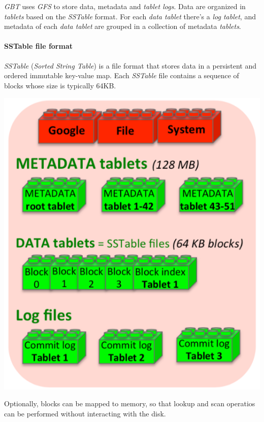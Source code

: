 \noindent\begin{minipage}[c]{0.7\textwidth}
    \emph{GBT} uses \emph{GFS} to store data, metadata and \emph{tablet logs}.
    Data are organized in \emph{tablets} based on the \emph{SSTable} format. For
    each \emph{data tablet} there's a \emph{log tablet}, and metadata of each
    \emph{data tablet} are grouped in a collection of metadata \emph{tablets}.

    \paragraph{SSTable file format}
    \emph{SSTable} (\emph{Sorted String Table}) is a file format that stores
    data in a persistent and ordered immutable key-value map. Each \emph{SSTable}
    file contains a sequence of blocks whose size is typically 64KB.
\end{minipage}\hfill
\begin{minipage}[c]{0.28\textwidth}
    \centering
    \includegraphics[width=\textwidth]{images/gbt-blocks1.png}
\end{minipage}

\noindent
Optionally, blocks can be mapped to memory, so that lookup and scan operatios
can be performed without interacting with the disk.

